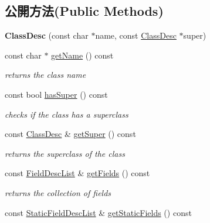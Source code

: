 \subsection*{公開方法(Public Methods)}
\begin{DoxyCompactItemize}
\item 
{\bfseries Class\+Desc} (const char $\ast$name, const \hyperlink{classagm_1_1reflection_1_1_class_desc}{Class\+Desc} $\ast$super)\hypertarget{classagm_1_1reflection_1_1_class_desc_a4fada6700ca543a37dece5694e59719b}{}\label{classagm_1_1reflection_1_1_class_desc_a4fada6700ca543a37dece5694e59719b}

\item 
const char $\ast$ \hyperlink{classagm_1_1reflection_1_1_class_desc_a275b548b7496b6714488464d694bac6e}{get\+Name} () const 
\begin{DoxyCompactList}\small\item\em returns the class name \end{DoxyCompactList}\item 
const bool \hyperlink{classagm_1_1reflection_1_1_class_desc_adf996f2053e6146d57e33985a73384d6}{has\+Super} () const 
\begin{DoxyCompactList}\small\item\em checks if the class has a superclass \end{DoxyCompactList}\item 
const \hyperlink{classagm_1_1reflection_1_1_class_desc}{Class\+Desc} \& \hyperlink{classagm_1_1reflection_1_1_class_desc_af28133215fb5c3c4f2a4230367a6a079}{get\+Super} () const 
\begin{DoxyCompactList}\small\item\em returns the superclass of the class \end{DoxyCompactList}\item 
const \hyperlink{classagm_1_1reflection_1_1_class_desc_a63d811e9dca6028408a4e57b3c7649c4}{Field\+Desc\+List} \& \hyperlink{classagm_1_1reflection_1_1_class_desc_af5041df2108695c66dac1916da038170}{get\+Fields} () const 
\begin{DoxyCompactList}\small\item\em returns the collection of fields \end{DoxyCompactList}\item 
const \hyperlink{classagm_1_1reflection_1_1_class_desc_a46ac1af257e4491e7bbdf38657696d71}{Static\+Field\+Desc\+List} \& \hyperlink{classagm_1_1reflection_1_1_class_desc_a22ed5c17f1f883ddc3ce792604fb8295}{get\+Static\+Fields} () const 

\end{DoxyCompactItemize}
